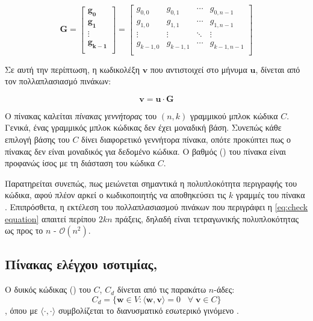 \begin{equation}
\mathbf{G}=\begin{bmatrix}\mathbf{g_0}\\\mathbf{g_1}\\\vdots\\\mathbf{g_{k-1}}\\\end{bmatrix}=\begin{bmatrix}g_{0,0} & g_{0,1} & \cdots & g_{0,n-1}\\g_{1,0} & g_{1,1} & \cdots & g_{1,n-1}\\\vdots & \vdots & \ddots & \vdots\\g_{k-1,0} & g_{k-1,1} & \cdots & g_{k-1,n-1}\\\end{bmatrix}
\label{eq:generator matrix}
\end{equation}

Σε αυτή την περίπτωση, η κωδικολέξη $\mathbf{v}$ που αντιστοιχεί στο μήνυμα $\mathbf{u}$, δίνεται από τον πολλαπλασιασμό πινάκων: 

\begin{equation}
\mathbf{v=u \cdot G}
\label{eq:check equation}
\end{equation}

Ο πίνακας  καλείται \textit{πίνακας γεννήτορας}  του $(n,k)$ γραμμικού μπλοκ κώδικα $C$. Γενικά, ένας γραμμικός μπλοκ κώδικας δεν έχει μοναδική βάση. Συνεπώς κάθε επιλογή βάσης του $C$ δίνει διαφορετικό γεννήτορα πίνακα, οπότε προκύπτει πως ο πίνακας  δεν είναι μοναδικός για δεδομένο κώδικα. Ο βαθμός () του πίνακα  είναι προφανώς ίσος με τη διάσταση του κώδικα $C$.

Παρατηρείται συνεπώς, πως μειώνεται σημαντικά η πολυπλοκότητα περιγραφής του κώδικα, αφού πλέον αρκεί ο κωδικοποιητής να αποθηκεύσει τις $k$ γραμμές του πίνακα . Επιπρόσθετα, η εκτέλεση του πολλαπλασιασμού πινάκων που περιγράφει η \ref{eq:check equation} απαιτεί περίπου $2kn$ πράξεις, δηλαδή είναι τετραγωνικής πολυπλοκότητας ως προς το $n$ - $\mathcal{O}(n^2)$.

\subsection{Πίνακας ελέγχου ισοτιμίας, }
\begin{definition}
Ο δυικός κώδικας () του $C$, $C_d$ δίνεται από τις παρακάτω $n$-άδες:$$C_d=\lbrace\mathbf{w}\in V:\langle \mathbf{w,v} \rangle =0\;\;\;\forall\;\mathbf{v}\in C\rbrace$$,
όπου με $\langle\cdot,\cdot\rangle$ συμβολίζεται το διανυσματικό εσωτερικό γινόμενο \cite{ryan2009channel}.
\label{def:dual code}
\end{definition}


